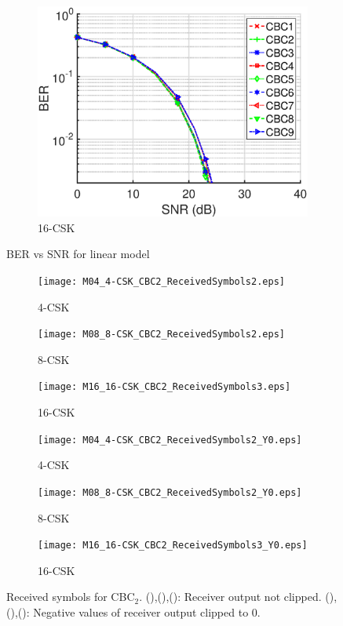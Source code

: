 \documentclass[10pt,letterpaper]{article}
\begin{document}
\begin{figure}[t]
\begin{subfigure}{0.32\textwidth}
		\centering
			\includegraphics[trim={0.1in 0.0in 0.6in 0.3in}, clip=true, width=\textwidth]{M16_16-CSK_BERvsSNR.eps}
			\caption{16-CSK}
			\label{fig16SNR}
		\end{subfigure}
	\caption{BER vs SNR for linear model}
	\label{figBERvsSNR}
\end{figure}
\begin{figure}[b]
	\centering
		\begin{subfigure}{0.32\textwidth}
		\centering
			\texttt{[image: M04\_4-CSK\_CBC2\_ReceivedSymbols2.eps]}
			\caption{4-CSK}
			\label{fig4RcvSym}
		\end{subfigure}
		\begin{subfigure}{0.32\textwidth}
		\centering
			\texttt{[image: M08\_8-CSK\_CBC2\_ReceivedSymbols2.eps]}
			\caption{8-CSK}
			\label{fig8RcvSym}
		\end{subfigure}
		\begin{subfigure}{0.32\textwidth}
		\centering
			\texttt{[image: M16\_16-CSK\_CBC2\_ReceivedSymbols3.eps]}
			\caption{16-CSK}
			\label{fig16RcvSym}
		\end{subfigure}
		\begin{subfigure}{0.32\textwidth}
		\centering
			\texttt{[image: M04\_4-CSK\_CBC2\_ReceivedSymbols2\_Y0.eps]}
			\caption{4-CSK}
			\label{fig4RcvSymY0}
		\end{subfigure}
		\begin{subfigure}{0.32\textwidth}
		\centering
			\texttt{[image: M08\_8-CSK\_CBC2\_ReceivedSymbols2\_Y0.eps]}
			\caption{8-CSK}
			\label{fig8RcvSymY0}
		\end{subfigure}
		\begin{subfigure}{0.32\textwidth}
		\centering
			\texttt{[image: M16\_16-CSK\_CBC2\_ReceivedSymbols3\_Y0.eps]}
			\caption{16-CSK}
			\label{fig16RcvSymY0}
		\end{subfigure}
	\caption{Received symbols for CBC$_{2}$. (),(),(): Receiver output not clipped. (),(),(): Negative values of receiver output clipped to 0.}
	\label{figRcvSym}
\end{figure}
\end{document}
